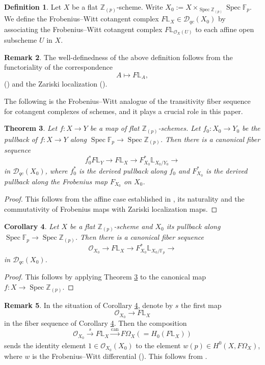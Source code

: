 \documentclass[11pt, a4paper]{amsart}
\theoremstyle{plain}
\newtheorem{theorem}{Theorem}[section]
\newtheorem{coro}[theorem]{Corollary}
\theoremstyle{definition}
\newtheorem{definition}[theorem]{Definition}
\newtheorem{remark}[theorem]{Remark}
\begin{document}
\begin{definition}\label{Def1.2}
    Let $X$ be a flat $\mathbb Z_{(p)}$-scheme. Write $X_0:=X\times_{\operatorname{Spec}{\mathbb Z_{(p)}}}\operatorname{Spec}\mathbb F_p$. We define the Frobenius--Witt cotangent complex $F\mathbb L_X\in \mathcal D_{qc}(X_0)$ by associating the Frobenius--Witt cotangent complex $F\mathbb L_{\mathcal O_X(U)}$ to each affine open subscheme $U$ in $X$.
\end{definition}
\begin{remark}
    The well-definedness of the above definition follows from the functoriality of the correspondence\[A\mapsto F\mathbb L_A,\] (\cite[Proposition 4.10]{Shi26}) and the Zariski localization (\cite[Corollary 5.4]{Shi26}).
\end{remark}
The following is the Frobenius--Witt analogue of the transitivity fiber sequence for cotangent complexes of schemes, and it plays a crucial role in this paper.
\begin{theorem}\label{thm1.4}
    Let $f:X\to Y$ be a map of flat $\mathbb Z_{(p)}$-schemes. Let $f_0:X_0\to Y_0$ be the pullback of $f:X\to Y$ along $\operatorname{Spec}\mathbb F_p\to \operatorname{Spec}\mathbb Z_{(p)}$. Then there is a canonical fiber sequence
    \[f_0^*F\mathbb L_Y\to F\mathbb L_X\to F^*_{X_0}\mathbb L_{X_0/Y_0}\to \] in $\mathcal D_{qc}(X_0)$, where $f_0^*$ is the derived pullback along $f_0$ and $F_{X_0}^*$ is the derived pullback along the Frobenius map $F_{X_0}$ on $X_0$.
\end{theorem}
\begin{proof}
    This follows from the affine case established in \cite[Theorem~5.3]{Shi26}, its naturality and the commutativity of Frobenius maps with Zariski localization maps.
\end{proof}
\begin{coro}\label{cor1.5}
    Let $X$ be a flat $\mathbb Z_{(p)}$-scheme and $X_0$ its pullback along $\operatorname{Spec}\mathbb F_p\to \operatorname{Spec}\mathbb Z_{(p)}$. Then there is a canonical fiber sequence \[\mathcal O_{X_0}\to F\mathbb L_X\to F_{X_0}^*\mathbb L_{X_0/\mathbb F_p}\to \] in $\mathcal D_{qc}(X_0)$.
\end{coro}
\begin{proof}
    This follows by applying Theorem \ref{thm1.4} to the canonical map $f:X\to \operatorname{Spec}\mathbb Z_{(p)}$.
\end{proof}
\begin{remark}\label{rem1.6}
    In the situation of Corollary \ref{cor1.5}, denote by $s$ the first map\[\mathcal O_{X_0}\to F\mathbb L_{X}\] in the fiber sequence of Corollary \ref{cor1.5}. Then the composition\[\mathcal O_{X_0}\xrightarrow[]{s}F\mathbb L_X\xrightarrow[]{\mathrm{can}}F\Omega_X(=H_0(F\mathbb L_X))\] sends the identity element $1\in \mathcal O_{X_0}(X_0)$ to the element $w(p)\in H^0(X,F\Omega_X)$, where $w$ is the Frobenius--Witt differential (\cite[Definition 2.2]{Sai22}). This follows from \cite[Corollary 5.8]{Shi26}.
\end{remark}
\end{document}
